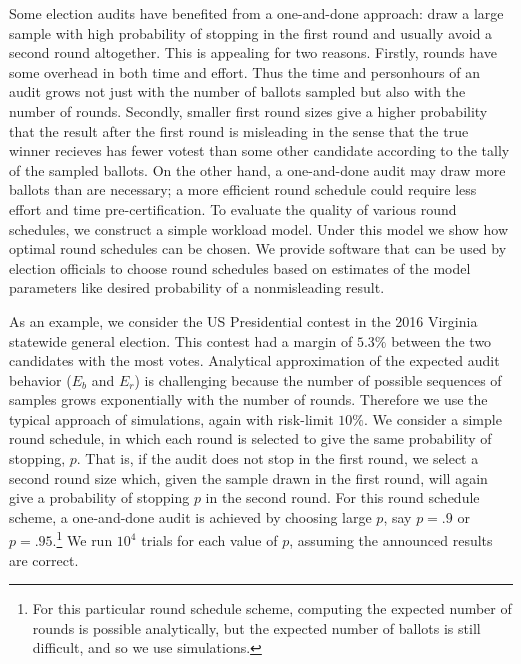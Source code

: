 Some election audits have benefited from a one-and-done approach: draw a large sample with high probability of stopping in the first round and usually avoid a second round altogether. This is appealing for two reasons. Firstly, rounds have some overhead in both time and effort. Thus the time and personhours of an audit grows not just with the number of ballots sampled but also with the number of rounds. Secondly, smaller first round sizes give a higher probability that the result after the first round is misleading in the sense that the true winner recieves has fewer votest than some other candidate according to the tally of the sampled ballots. On the other hand, a one-and-done audit may draw more ballots than are necessary; a more efficient round schedule could require less effort and time pre-certification. To evaluate the quality of various round schedules, we construct a simple workload model. Under this model we show how optimal round schedules can be chosen. We provide software that can be used by election officials to choose round schedules based on estimates of the model parameters like desired probability of a nonmisleading result.

As an example, we consider the US Presidential contest in the 2016 Virginia statewide general election. This contest had a margin of $5.3\%$ between the two candidates with the most votes.
Analytical approximation of the expected audit behavior ($E_b$ and $E_r$) is challenging because the number of possible sequences of samples grows exponentially with the number of rounds. 
Therefore we use the typical approach of simulations, again with risk-limit $10\%$.
We consider a simple round schedule, in which each round is selected to give the same probability of stopping, $p$. That is, if the audit does not stop in the first round, we select a second round size which, given the sample drawn in the first round, will again give a probability of stopping $p$ in the second round. For this round schedule scheme, a one-and-done audit is achieved by choosing large $p$, say $p=.9$ or $p=.95$.\footnote{For this particular round schedule scheme, computing the expected number of rounds is possible analytically, but the expected number of ballots is still difficult, and so we use simulations.} We run $10^4$ trials for each value of $p$, assuming the announced results are correct. 

